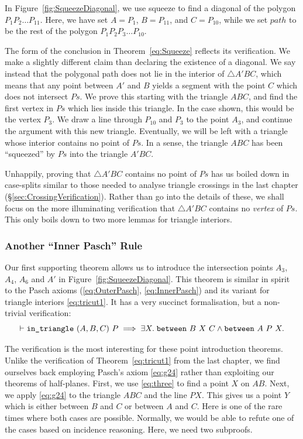 In Figure~\ref{fig:SqueezeDiagonal}, we use squeeze to find a diagonal of the polygon $P_1P_2\ldots P_{11}$. Here, we have set $A = P_1$, $B = P_{11}$, and $C = P_{10}$, while we set $path$ to be the rest of the polygon $P_1P_2P_3\ldots P_{10}$. 

The form of the conclusion in Theorem~\ref{eq:Squeeze} reflects its verification. We make a slightly different claim than declaring the existence of a diagonal. We say instead that the polygonal path does not lie in the interior of $\triangle A'BC$, which means that any point between $A'$ and $B$ yields a segment with the point $C$ which does not intersect $Ps$. We prove this starting with the triangle $ABC$, and find the first vertex in $Ps$ which lies inside this triangle. In the case shown, this would be the vertex $P_3$. We draw a line through $P_{10}$ and $P_3$ to the point $A_3$, and continue the argument with this new triangle. Eventually, we will be left with a triangle whose interior contains no point of $Ps$. In a sense, the triangle $ABC$ has been ``squeezed'' by $Ps$ into the triangle $A'BC$.

Unhappily, proving that $\triangle A'BC$ contains no point of $Ps$ has us boiled down in case-splits similar to those needed to analyse triangle crossings in the last chapter (\S\ref{sec:CrossingVerification}). Rather than go into the details of these, we shall focus on the more illuminating verification that $\triangle A'BC$ contains no \emph{vertex} of $Ps$. This only boils down to two more lemmas for triangle interiors.

\subsubsection{Another ``Inner Pasch'' Rule}
Our first supporting theorem allows us to introduce the intersection points $A_3$, $A_4$, $A_6$ and $A'$ in Figure~\ref{fig:SqueezeDiagonal}. This theorem is similar in spirit to the Pasch axioms (\ref{eq:OuterPasch}, \ref{eq:InnerPasch}) and its variant for triangle interiors \eqref{eq:tricut1}. It has a very succinct formalisation, but a non-trivial verification:
\begin{equation}\label{eq:TriCut3}
\vdash\texttt{in\_triangle}\ (A,B,C)\ P \implies \exists X.\; \texttt{between}\ B\ X\ C \wedge \texttt{between}\ A\ P\ X.
\end{equation}

The verification is the most interesting for these point introduction theorems. Unlike the verification of Theorem~\ref{eq:tricut1} from the last chapter, we find ourselves back employing Pasch's axiom \eqref{eq:g24} rather than exploiting our theorems of half-planes. First, we use \ref{eq:three} to find a point $X$ on $AB$. Next, we apply \eqref{eq:g24} to the triangle $ABC$ and the line $PX$. This gives us a point $Y$ which is either between $B$ and $C$ or between $A$ and $C$. Here is one of the rare times where both cases are possible. Normally, we would be able to refute one of the cases based on incidence reasoning. Here, we need two subproofs.

